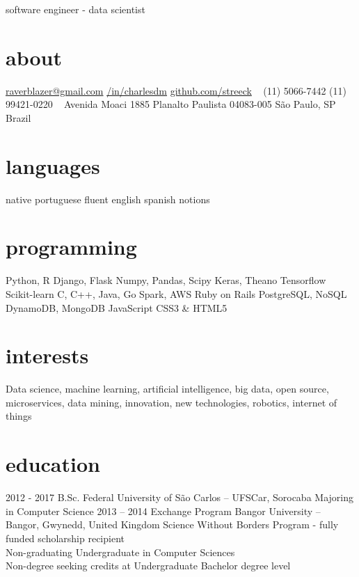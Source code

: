 \documentclass[]{friggeri-cv}
\begin{document}
       {software engineer - data scientist}


\begin{aside}
  \section{about}
    \href{mailto:raverblazer@gmail.com}{raverblazer@gmail.com}
    \href{http://www.linkedin.com/in/charlesdm}{\faLinkedinSign \space  /in/charlesdm}
    \href{https://github.com/streeck}{\faGithubSign \space github.com/streeck}
    ~
    (11) 5066-7442
    (11) 99421-0220
    ~
    Avenida Moaci 1885
    Planalto Paulista
    04083-005
    São Paulo, SP
    Brazil
  \section{languages}
    native portuguese
    fluent english
    spanish notions
  \section{programming}
    Python, R
    Django, Flask
    Numpy, Pandas, Scipy
    Keras, Theano
    Tensorflow
    Scikit-learn
    C, C++, Java, Go
    Spark, AWS
    Ruby on Rails
    PostgreSQL, NoSQL
    DynamoDB, MongoDB
    JavaScript
    CSS3 \& HTML5
\end{aside}

\section{interests}

Data science, machine learning, artificial intelligence, big data, open source,  microservices, data mining, innovation, new technologies, robotics, internet of things

\section{education}

\begin{entrylist}
  \entry
    {2012 - 2017}
    {B.Sc.}
    {Federal University of São Carlos -- UFSCar, Sorocaba}
    {Majoring in Computer Science}
  \entry
    {2013 – 2014}
    {Exchange Program}
    {Bangor University -- Bangor, Gwynedd, United Kingdom}
    {Science Without Borders Program - fully funded scholarship recipient \\
    Non-graduating Undergraduate in Computer Sciences \\
    Non-degree seeking credits at Undergraduate Bachelor degree level}
\end{entrylist}
\end{document}
